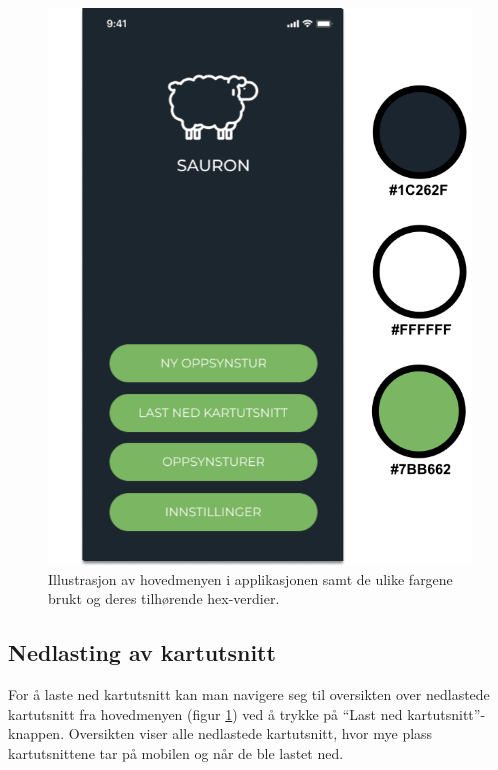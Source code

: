 \begin{figure}[H]
\centering
\captionsetup{width=.8\linewidth}
\includegraphics[scale=0.4]{Figurer/Bilder/valg-av-farger.png}
\caption{Illustrasjon av hovedmenyen i applikasjonen samt de ulike fargene brukt og deres tilhørende hex-verdier.}
\label{fig:valg-av-farger}
\end{figure}

\subsection{Nedlasting av kartutsnitt}
For å laste ned kartutsnitt kan man navigere seg til oversikten over nedlastede kartutsnitt fra hovedmenyen (figur \ref{fig:valg-av-farger}) ved å trykke på \enquote{Last ned kartutsnitt}-knappen. Oversikten viser alle nedlastede kartutsnitt, hvor mye plass kartutsnittene tar på mobilen og når de ble lastet ned.

